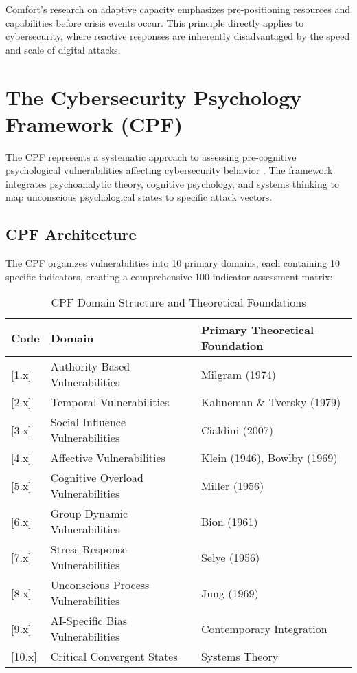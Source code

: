 \documentclass[11pt,a4paper]{article}
\begin{document}
Comfort's \cite{comfort2007} research on adaptive capacity emphasizes pre-positioning resources and capabilities before crisis events occur. This principle directly applies to cybersecurity, where reactive responses are inherently disadvantaged by the speed and scale of digital attacks.

\section{The Cybersecurity Psychology Framework (CPF)}

The CPF represents a systematic approach to assessing pre-cognitive psychological vulnerabilities affecting cybersecurity behavior \cite{canale2025cpf}. The framework integrates psychoanalytic theory, cognitive psychology, and systems thinking to map unconscious psychological states to specific attack vectors.

\subsection{CPF Architecture}

The CPF organizes vulnerabilities into 10 primary domains, each containing 10 specific indicators, creating a comprehensive 100-indicator assessment matrix:

\begin{table}[h!]
\centering
\caption{CPF Domain Structure and Theoretical Foundations}
\label{tab:cpf_domains}
\begin{tabular}{lll}
\toprule
Code & Domain & Primary Theoretical Foundation \\
\midrule
{[}1.x{]} & Authority-Based Vulnerabilities & Milgram (1974) \\
{[}2.x{]} & Temporal Vulnerabilities & Kahneman \& Tversky (1979) \\
{[}3.x{]} & Social Influence Vulnerabilities & Cialdini (2007) \\
{[}4.x{]} & Affective Vulnerabilities & Klein (1946), Bowlby (1969) \\
{[}5.x{]} & Cognitive Overload Vulnerabilities & Miller (1956) \\
{[}6.x{]} & Group Dynamic Vulnerabilities & Bion (1961) \\
{[}7.x{]} & Stress Response Vulnerabilities & Selye (1956) \\
{[}8.x{]} & Unconscious Process Vulnerabilities & Jung (1969) \\
{[}9.x{]} & AI-Specific Bias Vulnerabilities & Contemporary Integration \\
{[}10.x{]} & Critical Convergent States & Systems Theory \\
\bottomrule
\end{tabular}
\end{table}
\end{document}
